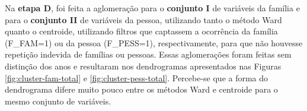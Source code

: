 \begin{table}[htb]
\end{table}

Na \textbf{etapa D}, foi feita a aglomeração para o \textbf{conjunto I} de variáveis da família e para o \textbf{conjunto II} de variáveis da pessoa, utilizando tanto o método Ward quanto o centroide, utilizando filtros que captassem a ocorrência da família (F_FAM=1) ou da pessoa (F_PESS=1), respectivamente, para que não houvesse repetição indevida de famílias ou pessoas. Essas aglomerações foram feitas sem distinção dos anos e resultaram nos dendrogramas apresentados nas Figuras \ref{fig:cluster-fam-total} e \ref{fig:cluster-pess-total}. Percebe-se que a forma do dendrograma difere muito pouco entre os métodos Ward e centroide para o mesmo conjunto de variáveis.

